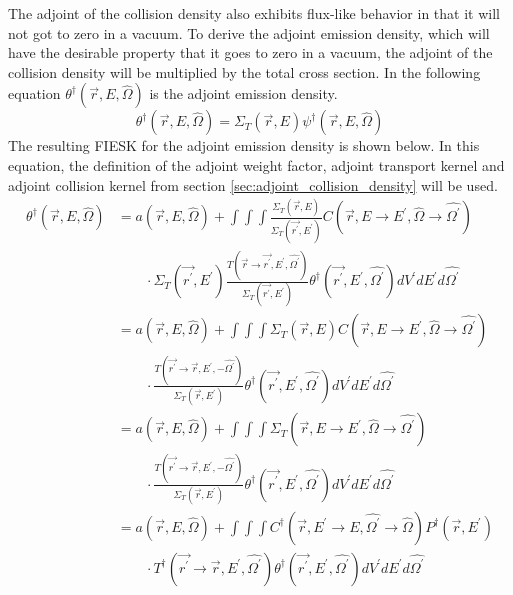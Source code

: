 The adjoint of the collision density also exhibits flux-like behavior in that
it will not got to zero in a vacuum. To derive the adjoint emission density,
which will have the desirable property that it goes to zero in a vacuum, the
adjoint of the collision density will be multiplied by the total cross section.
In the following equation $\theta^{\dagger}(\vec{r},E,\hat{\Omega})$ is the
adjoint emission density.
\begin{equation}
  \theta^{\dagger}(\vec{r},E,\hat{\Omega}) = \Sigma_T(\vec{r},E)
  \psi^{\dagger}(\vec{r},E,\hat{\Omega})
  \label{eq:adj_emission_dens_to_adj_of_collision_dens}
\end{equation}
The resulting FIESK for the adjoint emission density is shown below. In this
equation, the definition of the adjoint weight factor, adjoint transport 
kernel and adjoint collision kernel from section 
\ref{sec:adjoint_collision_density} will be used.
\begin{align}
  \theta^{\dagger}(\vec{r},E,\hat{\Omega}) & = a(\vec{r},E,\hat{\Omega}) + 
  \int\int\int \frac{\Sigma_T(\vec{r},E)}{\Sigma_T(\vec{r^{'}},E^{'})}
  C(\vec{r},E \to E^{'},\hat{\Omega} \to \hat{\Omega^{'}}) \nonumber \\
    & \qquad \cdot \Sigma_T(\vec{r^{'}},E^{'})
  \frac{T(\vec{r} \to \vec{r^{'}},E^{'},\hat{\Omega^{'}})}
       {\Sigma_T(\vec{r^{'}},E^{'})}
  \theta^{\dagger}(\vec{r^{'}},E^{'},\hat{\Omega^{'}}) dV^{'}dE^{'}d\hat{\Omega^{'}}
  \nonumber \\
  & = a(\vec{r},E,\hat{\Omega}) + 
  \int\int\int \Sigma_T(\vec{r},E) 
  C(\vec{r},E \to E^{'},\hat{\Omega} \to \hat{\Omega^{'}}) \nonumber \\
  & \qquad \cdot \frac{T(\vec{r^{'}} \to \vec{r},E^{'},-\hat{\Omega^{'}})}
                      {\Sigma_T(\vec{r},E^{'})}
  \theta^{\dagger}(\vec{r^{'}},E^{'},\hat{\Omega^{'}}) dV^{'}dE^{'}d\hat{\Omega^{'}}
  \nonumber \\
  & = a(\vec{r},E,\hat{\Omega}) + 
  \int\int\int \Sigma_T(\vec{r},E \to E^{'},\hat{\Omega} \to \hat{\Omega^{'}}) 
  \nonumber \\
  & \qquad \cdot \frac{T(\vec{r^{'}} \to \vec{r},E^{'},-\hat{\Omega^{'}})}
           {\Sigma_T(\vec{r},E^{'})}
    \theta^{\dagger}(\vec{r^{'}},E^{'},\hat{\Omega^{'}}) dV^{'}dE^{'}d\hat{\Omega^{'}}
  \nonumber \\
  & = a(\vec{r},E,\hat{\Omega}) +
  \int\int\int 
  C^{\dagger}(\vec{r},E^{'} \to E,\hat{\Omega^{'}} \to \hat{\Omega})
  P^{\dagger}(\vec{r},E^{'}) \nonumber \\
  & \qquad \cdot 
  T^{\dagger}(\vec{r^{'}} \to \vec{r},E^{'},\hat{\Omega^{'}})
  \theta^{\dagger}(\vec{r^{'}},E^{'},\hat{\Omega^{'}}) dV^{'}dE^{'}d\hat{\Omega^{'}}
  \nonumber 
\end{align}

